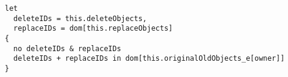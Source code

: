 \lstset{frame=tb, aboveskip=12pt, belowskip=-3pt, breaklines=true, basicstyle=\small\ttfamily, tabsize=2, mathescape=true}
\begin{lstlisting}[caption={base\_deltas.als, lines 74-85}, label=alloy:wellformeddeltas, captionpos=b]
let
  deleteIDs = this.deleteObjects,
  replaceIDs = dom[this.replaceObjects]
{
  no deleteIDs & replaceIDs
  deleteIDs + replaceIDs in dom[this.originalOldObjects_e[owner]]
}
\end{lstlisting}
